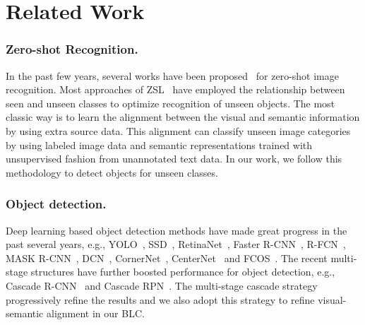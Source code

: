 \documentclass[runningheads]{llncs}
\begin{document}
\section{Related Work}

\subsubsection{Zero-shot Recognition.}
In the past few years, several works have been proposed~\cite{bendale2016towards,changpinyo2016synthesized,elhoseiny2013write,frome2013devise,jain2014multi,kodirov2017semantic,lampert2009learning,lampert2013attribute,nilsback2008automated,norouzi2013zero,rahman2018unified,xian2017zero,zhang2015zero,zhang2016zero1,zhang2016zero2} for zero-shot image recognition. Most approaches of ZSL~\cite{al2017automatic,al2016recovering,lampert2013attribute,xian2018zero,zablocki2019context,luo2019context,krishna2017visual,mishra2018generative,kumar2018generalized,verma2017simple,verma2020meta} have employed the relationship between seen and unseen classes to optimize recognition of unseen objects. The most classic way is to learn the alignment between the visual and semantic information by using extra source data. This alignment can classify unseen image categories by using labeled image data and semantic representations trained with unsupervised fashion from unannotated text data. In our work, we follow this methodology to detect objects for unseen classes.

\subsubsection{Object detection.}
Deep learning based object detection methods have made great progress in the past several years, e.g., YOLO~\cite{yolo}, SSD~\cite{ssd}, RetinaNet~\cite{retinaNet}, Faster R-CNN~\cite{fasterrcnn}, R-FCN~\cite{rfcn}, MASK R-CNN~\cite{maskrcnn}, DCN~\cite{dcn}, CornerNet~\cite{cornernet}, CenterNet~\cite{centernet} and FCOS~\cite{fcos}. The recent multi-stage structures have further boosted performance for object detection, e.g., Cascade R-CNN~\cite{cascadercnn} and Cascade RPN~\cite{cai2018cascade}. The multi-stage cascade strategy progressively refine the results and we also adopt this strategy to refine visual-semantic alignment in our BLC.
\end{document}
